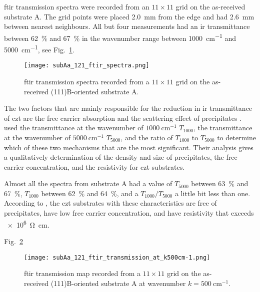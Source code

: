 \Ac{ftir} transmission spectra were recorded from an $11\times11$ grid on the as-received substrate A. The grid points were placed \SI{2.0}{\milli\metre} from the edge and had \SI{2.6}{\milli\metre} between nearest neighbours. All but four measurements had an \ac{ir} transmittance between \SI{62}{\percent} and \SI{67}{\percent} in the wavenumber range between \SI{1000}{\centi\metre^{-1}} and \SI{5000}{\centi\metre^{-1}}, see Fig.~\ref{fig:subAa_ftir_spectrum}.

\begin{figure}[htbp]
    \centering
    \texttt{[image: subAa\_121\_ftir\_spectra.png]}
    \caption[\Ac{ftir} transmission spectra for the as-received substrate A.]{\Acf{ftir} transmission spectra recorded from a $11\times11$ grid on the as-received (111)B-oriented substrate A.}
    \label{fig:subAa_ftir_spectrum}
\end{figure}

The two factors that are mainly responsible for the reduction in \ac{ir} transmittance of \ac{czt} are the free carrier absorption and the scattering effect of precipitates \citep{yadava1994precipitation}. \citet{yujie2004infrared} used the transmittance at the wavenumber of $\SI{1000}{\centi\metre^{-1}}$ $T_{1000}$, the transmittance at the wavenumber of $\SI{5000}{\centi\metre^{-1}}$ $T_{5000}$, and the ratio of $T_{1000}$ to $T_{5000}$ to determine which of these two mechanisms that are the most significant. Their analysis gives a qualitatively determination of the density and size of  precipitates, the free carrier concentration, and the resistivity for \ac{czt} substrates.

Almost all the spectra from substrate A had a value of $T_{5000}$ between \SI{63}{\percent} and \SI{67}{\percent}, $T_{1000}$ between \SI{62}{\percent} and \SI{64}{\percent}, and a $T_{1000}/T_{5000}$ a little bit less than one. According to \citet{yujie2004infrared}, the \ac{czt} substrates with these characteristics are free of precipitates, have low free carrier concentration, and have resistivity that exceeds \SI{e6}{\ohm\centi\metre}.

 Fig.~\ref{fig:subAa_ftir_map_500cm-1}

\begin{figure}[htbp]
    \centering
    \texttt{[image: subAa\_121\_ftir\_transmission\_at\_k500cm-1.png]}
    \caption[\Ac{ftir} transmission map for the as-received substrate A at $k=\SI{500}{\centi\metre^{-1}}$.]{\Acf{ftir} transmission map recorded from a $11\times11$ grid on the as-received (111)B-oriented substrate A at wavenumber $k=\SI{500}{\centi\metre^{-1}}$.}
    \label{fig:subAa_ftir_map_500cm-1}
\end{figure}

